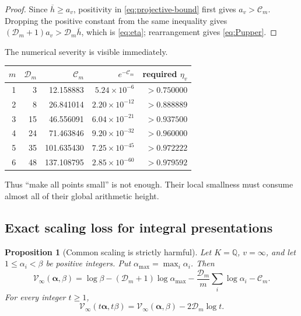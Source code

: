 \documentclass[11pt]{article}
\newtheorem{proposition}[theorem]{Proposition}
\theoremstyle{definition}
\newcommand{\Q}{\mathbb Q}
\newcommand{\D}{\mathcal D}
\newcommand{\Kc}{\mathcal C}
\newcommand{\Vdef}{\mathcal V}
\begin{document}
\begin{proof}
Since $\overline h\ge a_v$, positivity in \eqref{eq:projective-bound} first gives
$a_v>\Kc_m$.  Dropping the positive constant from the same inequality gives
$(\D_m+1)a_v>\D_m\overline h$, which is \eqref{eq:eta}; rearrangement gives
\eqref{eq:Pupper}.
\end{proof}

The numerical severity is visible immediately.

\begin{center}
\begin{tabular}{@{}rrrrr@{}}
\toprule
$m$ & $\D_m$ & $\Kc_m$ & $e^{-\Kc_m}$ & required $\eta_v$ \\
\midrule
1 & 3  & 12.158883 & $5.24\times10^{-6}$  & $>0.750000$ \\
2 & 8  & 26.841014 & $2.20\times10^{-12}$ & $>0.888889$ \\
3 & 15 & 46.556091 & $6.04\times10^{-21}$ & $>0.937500$ \\
4 & 24 & 71.463846 & $9.20\times10^{-32}$ & $>0.960000$ \\
5 & 35 & 101.635430& $7.25\times10^{-45}$ & $>0.972222$ \\
6 & 48 & 137.108795& $2.85\times10^{-60}$ & $>0.979592$ \\
\bottomrule
\end{tabular}
\end{center}

Thus ``make all points small'' is not enough.  Their local smallness must consume almost all
of their global arithmetic height.

\subsection{Exact scaling loss for integral presentations}

\begin{proposition}[Common scaling is strictly harmful]\label{prop:scaling}
Let $K=\Q$, $v=\infty$, and let $1\le\alpha_i<\beta$ be positive integers.  Put
$\alpha_{\max}=\max_i\alpha_i$.  Then
\begin{equation}\label{eq:integer-defect}
 \Vdef_\infty(\boldsymbol\alpha,\beta)
 =\log\beta-(\D_m+1)\log\alpha_{\max}
   -\frac{\D_m}{m}\sum_i\log\alpha_i-\Kc_m.
\end{equation}
For every integer $t\ge1$,
\begin{equation}\label{eq:scaling-law}
 \Vdef_\infty(t\boldsymbol\alpha,t\beta)
 =\Vdef_\infty(\boldsymbol\alpha,\beta)-2\D_m\log t.
\end{equation}
\end{proposition}
\end{document}
